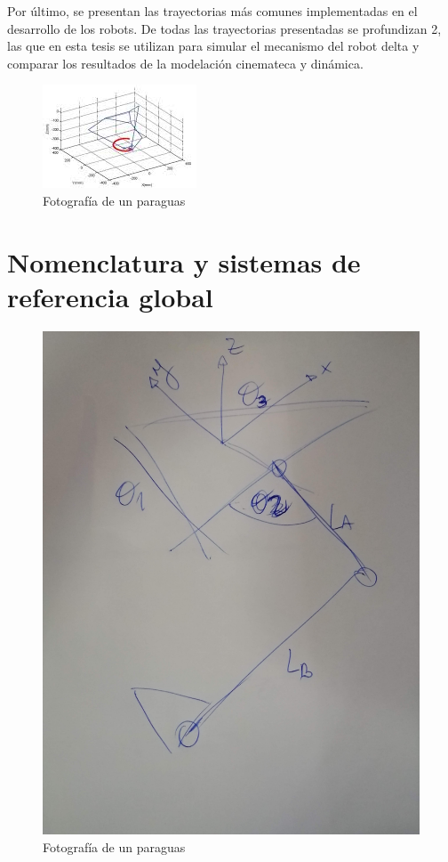     Por último, se presentan las trayectorias más comunes implementadas en el desarrollo de los robots. De todas las trayectorias presentadas se profundizan 2, las que en esta tesis se utilizan para simular el mecanismo del robot delta y comparar los resultados de la modelación cinemateca y dinámica.
    
        \begin{figure}[htb]
             \centering
             \includegraphics[width=0.7\linewidth]{Main/Chapter4/Images4/Metodologia_tray.png}
              \caption{Fotografía de un paraguas}
              \label{f:Cap4_metodologia_tray}
        \end{figure}  
    
     \newpage


\section{Nomenclatura y sistemas de referencia global}

        \begin{figure}[htb]
             \centering
             \includegraphics[width=0.7\linewidth]{Main/Chapter4/Images4/ref1.jpg}
              \caption{Fotografía de un paraguas}
              \label{f:ref1}
        \end{figure}

